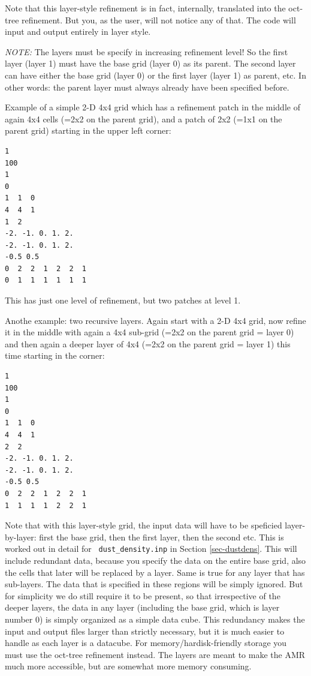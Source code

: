 \documentclass{report}
\newenvironment{asciibox}%
  {\begin{list}{}{%
    \setlength{\topsep}{0.5em}%
    \setlength{\parskip}{0em}%
    \setlength{\parsep}{0em}%
    \setlength{\itemsep}{0em}%
    \setlength{\rightmargin}{0em}%
    \setlength{\leftmargin}{3.0em}%
    \setlength{\labelsep}{1em}%
    \setlength{\labelwidth}{2em}%
  }\normalfont\footnotesize\item}
  {\end{list}}
\begin{document}
Note that this layer-style refinement is in fact, internally, translated
into the oct-tree refinement. But you, as the user, will not notice any
of that. The code will input and output entirely in layer style. 

{\em NOTE:} The layers must be specify in increasing refinement level!  So
the first layer (layer 1) must have the base grid (layer 0) as its
parent. The second layer can have either the base grid (layer 0) or the
first layer (layer 1) as parent, etc. In other words: the parent layer
must always already have been specified before. 

Example of a simple 2-D 4x4 grid which has a refinement patch in the middle
of again 4x4 cells (=2x2 on the parent grid), and a patch of 2x2 (=1x1 on
the parent grid) starting in the upper left corner:
\begin{asciibox}\begin{verbatim}
1
100
1
0
1  1  0
4  4  1
1  2
-2. -1. 0. 1. 2.
-2. -1. 0. 1. 2.
-0.5 0.5
0  2  2  1  2  2  1
0  1  1  1  1  1  1
\end{verbatim}\end{asciibox}
This has just one level of refinement, but two patches at level 1. 

Anothe example: two recursive layers. Again start with a 2-D 4x4 grid,
now refine it in the middle with again a 4x4 sub-grid (=2x2 on the parent
grid = layer 0) and then again a deeper layer of 4x4 (=2x2 on the
parent grid = layer 1) this time starting in the corner:
\begin{asciibox}\begin{verbatim}
1
100
1
0
1  1  0
4  4  1
2  2
-2. -1. 0. 1. 2.
-2. -1. 0. 1. 2.
-0.5 0.5
0  2  2  1  2  2  1
1  1  1  1  2  2  1
\end{verbatim}\end{asciibox}

Note that with this layer-style grid, the input data will have to be
speficied layer-by-layer: first the base grid, then the first layer, then
the second etc. This is worked out in detail for {\small\tt
  dust\_density.inp} in Section \ref{sec-dustdens}. This will include
redundant data, because you specify the data on the entire base grid, also
the cells that later will be replaced by a layer. Same is true for any layer
that has sub-layers. The data that is specified in these regions will be
simply ignored. But for simplicity we do still require it to be present, so
that irrespective of the deeper layers, the data in any layer (including the
base grid, which is layer number 0) is simply organized as a simple data
cube. This redundancy makes the input and output files larger than strictly
necessary, but it is much easier to handle as each layer is a datacube. For
memory/hardisk-friendly storage you must use the oct-tree refinement
instead. The layers are meant to make the AMR much more accessible, but are
somewhat more memory consuming.
\end{document}
